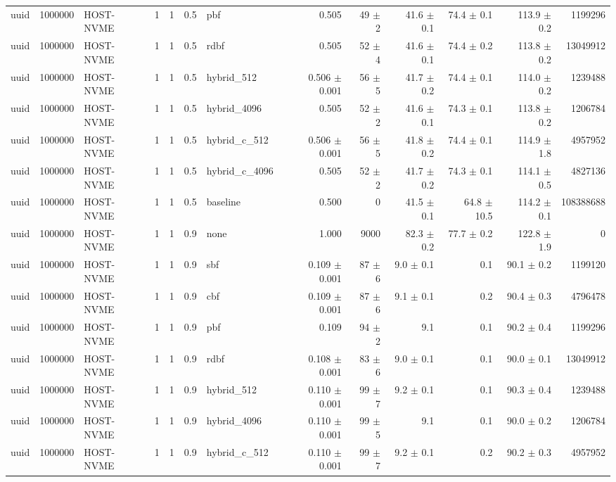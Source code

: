 \begin{tabular}{lllllllrrrrrr}
uuid & 1000000 & HOST-NVME & 1 & 1 & 0.5 & pbf & 0.505 & 49 $\pm$ 2 & 41.6 $\pm$ 0.1 & 74.4 $\pm$ 0.1 & 113.9 $\pm$ 0.2 & 1199296 \\
uuid & 1000000 & HOST-NVME & 1 & 1 & 0.5 & rdbf & 0.505 & 52 $\pm$ 4 & 41.6 $\pm$ 0.1 & 74.4 $\pm$ 0.2 & 113.8 $\pm$ 0.2 & 13049912 \\
uuid & 1000000 & HOST-NVME & 1 & 1 & 0.5 & hybrid\_512 & 0.506 $\pm$ 0.001 & 56 $\pm$ 5 & 41.7 $\pm$ 0.2 & 74.4 $\pm$ 0.1 & 114.0 $\pm$ 0.2 & 1239488 \\
uuid & 1000000 & HOST-NVME & 1 & 1 & 0.5 & hybrid\_4096 & 0.505 & 52 $\pm$ 2 & 41.6 $\pm$ 0.1 & 74.3 $\pm$ 0.1 & 113.8 $\pm$ 0.2 & 1206784 \\
uuid & 1000000 & HOST-NVME & 1 & 1 & 0.5 & hybrid\_c\_512 & 0.506 $\pm$ 0.001 & 56 $\pm$ 5 & 41.8 $\pm$ 0.2 & 74.4 $\pm$ 0.1 & 114.9 $\pm$ 1.8 & 4957952 \\
uuid & 1000000 & HOST-NVME & 1 & 1 & 0.5 & hybrid\_c\_4096 & 0.505 & 52 $\pm$ 2 & 41.7 $\pm$ 0.2 & 74.3 $\pm$ 0.1 & 114.1 $\pm$ 0.5 & 4827136 \\
uuid & 1000000 & HOST-NVME & 1 & 1 & 0.5 & baseline & 0.500 & 0 & 41.5 $\pm$ 0.1 & 64.8 $\pm$ 10.5 & 114.2 $\pm$ 0.1 & 108388688 \\
uuid & 1000000 & HOST-NVME & 1 & 1 & 0.9 & none & 1.000 & 9000 & 82.3 $\pm$ 0.2 & 77.7 $\pm$ 0.2 & 122.8 $\pm$ 1.9 & 0 \\
uuid & 1000000 & HOST-NVME & 1 & 1 & 0.9 & sbf & 0.109 $\pm$ 0.001 & 87 $\pm$ 6 & 9.0 $\pm$ 0.1 & 0.1 & 90.1 $\pm$ 0.2 & 1199120 \\
uuid & 1000000 & HOST-NVME & 1 & 1 & 0.9 & cbf & 0.109 $\pm$ 0.001 & 87 $\pm$ 6 & 9.1 $\pm$ 0.1 & 0.2 & 90.4 $\pm$ 0.3 & 4796478 \\
uuid & 1000000 & HOST-NVME & 1 & 1 & 0.9 & pbf & 0.109 & 94 $\pm$ 2 & 9.1 & 0.1 & 90.2 $\pm$ 0.4 & 1199296 \\
uuid & 1000000 & HOST-NVME & 1 & 1 & 0.9 & rdbf & 0.108 $\pm$ 0.001 & 83 $\pm$ 6 & 9.0 $\pm$ 0.1 & 0.1 & 90.0 $\pm$ 0.1 & 13049912 \\
uuid & 1000000 & HOST-NVME & 1 & 1 & 0.9 & hybrid\_512 & 0.110 $\pm$ 0.001 & 99 $\pm$ 7 & 9.2 $\pm$ 0.1 & 0.1 & 90.3 $\pm$ 0.4 & 1239488 \\
uuid & 1000000 & HOST-NVME & 1 & 1 & 0.9 & hybrid\_4096 & 0.110 $\pm$ 0.001 & 99 $\pm$ 5 & 9.1 & 0.1 & 90.0 $\pm$ 0.2 & 1206784 \\
uuid & 1000000 & HOST-NVME & 1 & 1 & 0.9 & hybrid\_c\_512 & 0.110 $\pm$ 0.001 & 99 $\pm$ 7 & 9.2 $\pm$ 0.1 & 0.2 & 90.2 $\pm$ 0.3 & 4957952 \\

\end{tabular}
